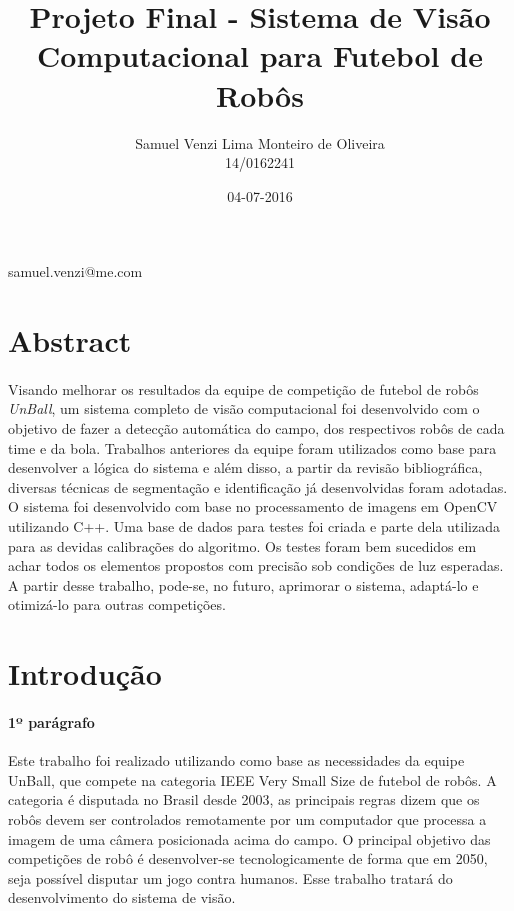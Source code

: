 \documentclass[conference, harvard, brazil, english]{sbatex}
\begin{document}
	\title{Projeto Final - Sistema de Visão Computacional para Futebol de Robôs}
	\date{04-07-2016}
	\author{Samuel Venzi Lima Monteiro de Oliveira\\14/0162241}{samuel.venzi@me.com}
	
	
	\section{Abstract}
		\paragraph{}
		Visando melhorar os resultados da equipe de competição de futebol de robôs \textit{UnBall}, um sistema completo de visão computacional foi desenvolvido com o objetivo de fazer a detecção automática do campo, dos respectivos robôs de cada time e da bola. Trabalhos anteriores da equipe foram utilizados como base para desenvolver a lógica do sistema e além disso, a partir da revisão bibliográfica, diversas técnicas de segmentação e identificação já desenvolvidas foram adotadas. O sistema foi desenvolvido com base no processamento de imagens em OpenCV utilizando C++. Uma base de dados para testes foi criada e parte dela utilizada para as devidas calibrações do algoritmo. Os testes foram bem sucedidos em achar todos os elementos propostos com precisão sob condições de luz esperadas. A partir desse trabalho, pode-se, no futuro, aprimorar o sistema, adaptá-lo e otimizá-lo para outras competições.
		
	\section{Introdução}
		\paragraph{1º parágrafo}
		Este trabalho foi realizado utilizando como base as necessidades da equipe UnBall, que compete na categoria IEEE Very Small Size de futebol de robôs. A categoria é disputada no Brasil desde 2003, as principais regras dizem que os robôs devem ser controlados remotamente por um computador que processa a imagem de uma câmera posicionada acima do campo. O principal objetivo das competições de robô é desenvolver-se tecnologicamente de forma que em 2050, seja possível disputar um jogo contra humanos. Esse trabalho tratará do desenvolvimento do sistema de visão.
\end{document}
